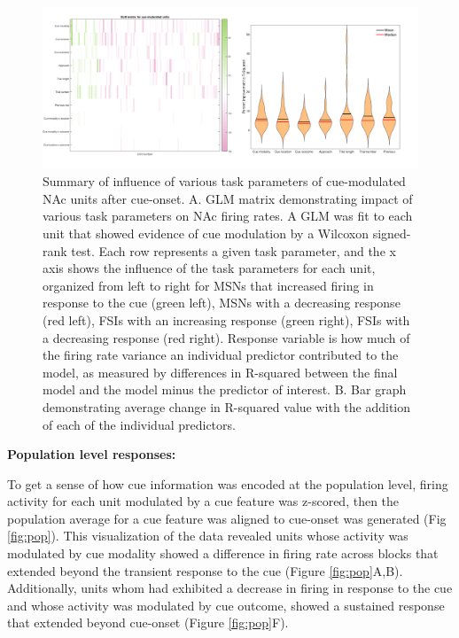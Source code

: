\documentclass[11pt]{article}
\begin{document}
\begin{figure}[h]
\centering
\includegraphics[width=\textwidth]{Fig 6 - GLM.png}
\caption{Summary of influence of various task parameters of cue-modulated NAc units after cue-onset. A. GLM matrix demonstrating impact of various task parameters on NAc firing rates. A GLM was fit to each unit that showed evidence of cue modulation by a Wilcoxon signed-rank test. Each row represents a given task parameter, and the x axis shows the influence of the task parameters for each unit, organized from left to right for MSNs that increased firing in response to the cue (green left), MSNs with a decreasing response (red left), FSIs with an increasing response (green right), FSIs with a decreasing response (red right). Response variable is how much of the firing rate variance an individual predictor contributed to the model, as measured by differences in R-squared between the final model and the model minus the predictor of interest. B. Bar graph demonstrating average change in R-squared value with the addition of each of the individual predictors.}
\label{fig:GLM}
\end{figure}

{\bf Population level responses:}

To get a sense of how cue information was encoded at the population level, firing activity for each unit modulated by a cue feature was z-scored, then the population average for a cue feature was aligned to cue-onset was generated (Fig \ref{fig:pop}). This visualization of the data revealed units whose activity was modulated by cue modality showed a difference in firing rate across blocks that extended beyond the transient response to the cue (Figure \ref{fig:pop}A,B). Additionally, units whom had exhibited a decrease in firing in response to the cue and whose activity was modulated by cue outcome, showed a sustained response that extended beyond cue-onset (Figure \ref{fig:pop}F).  
\end{document}
